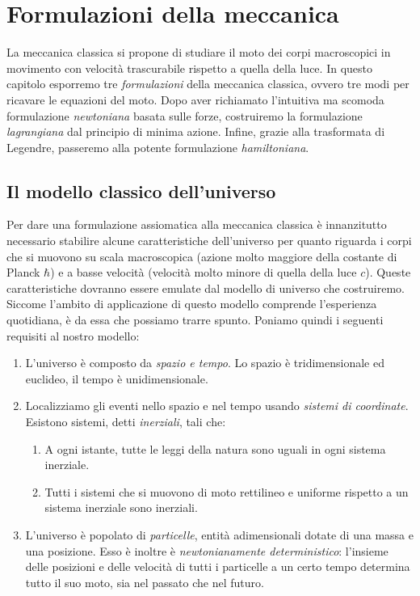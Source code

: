 \chapter{Formulazioni della meccanica}
La meccanica classica si propone di studiare il moto dei corpi macroscopici in movimento con velocità trascurabile rispetto a quella della luce. In questo capitolo esporremo tre \emph{formulazioni} della meccanica classica, ovvero tre modi per ricavare le equazioni del moto. Dopo aver richiamato l'intuitiva ma scomoda formulazione \emph{newtoniana} basata sulle forze, costruiremo la formulazione \emph{lagrangiana} dal principio di minima azione. Infine, grazie alla trasformata di Legendre, passeremo alla potente formulazione \emph{hamiltoniana}.

\section{Il modello classico dell'universo}
Per dare una formulazione assiomatica alla meccanica classica è innanzitutto necessario stabilire alcune caratteristiche dell'universo per quanto riguarda i corpi che si muovono su scala macroscopica (azione molto maggiore della costante di Planck $\hbar$) e a basse velocità (velocità molto minore di quella della luce $c$). Queste caratteristiche dovranno essere emulate dal modello di universo che costruiremo. Siccome l'ambito di applicazione di questo modello comprende l'esperienza quotidiana, è da essa che possiamo trarre spunto. Poniamo quindi i seguenti requisiti al nostro modello:
\begin{enumerate}
  \item L'universo è composto da \emph{spazio e tempo}. Lo spazio è tridimensionale ed euclideo, il tempo è unidimensionale.
  \item Localizziamo gli eventi nello spazio e nel tempo usando \emph{sistemi di coordinate}. Esistono sistemi, detti \emph{inerziali}, tali che:
  \begin{enumerate}
    \item A ogni istante, tutte le leggi della natura sono uguali in ogni sistema inerziale.
    \item Tutti i sistemi che si muovono di moto rettilineo e uniforme rispetto a un sistema inerziale sono inerziali.
  \end{enumerate}
  \item L'universo è popolato di \emph{particelle}, entità adimensionali dotate di una massa e una posizione. Esso è inoltre è \emph{newtonianamente deterministico}: l'insieme delle posizioni e delle velocità di tutti i particelle a un certo tempo determina tutto il suo moto, sia nel passato che nel futuro.
\end{enumerate}

